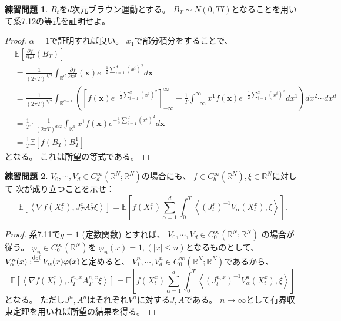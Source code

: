 \documentclass[uplatex]{jsarticle}
\theoremstyle{definition}
\newtheorem{prob}[prob]{練習問題}
\def\R{\mathbb{R}}
\def\E{\mathbb{E}}
\def\dfn{:\overset{\mbox{{\scriptsize def}}}{=}}
\begin{document}
\begin{prob}\label{prob: 7.6}
  \(B_t\)を\(d\)次元ブラウン運動とする。
  \(B_T \sim N(0,TI)\)となることを用いて系7.12の等式を証明せよ。
\end{prob}

\begin{proof}
  \(\alpha = 1\)で証明すれば良い。
  \(x_1\)で部分積分をすることで、
  \begin{align*}
    &\E \left[ \frac{\partial f}{\partial x^1}(B_T)\right] \\
    &= \frac{1}{(2\pi T)^{d/2}} \int_{\R^d}
    \frac{\partial f}{\partial x^1}(\mathbf{x})
    e^{-\frac{1}{2}\sum_{i=1}^d (x^i)^2} d\mathbf{x} \\
    &= \frac{1}{(2\pi T)^{d/2}} \int_{\R^{d-1}} \left( \left[
    f(\mathbf{x})e^{-\frac{1}{2}\sum_{i=1}^d (x^i)^2} \right]_{-\infty}^\infty
    + \frac{1}{T} \int_{-\infty}^\infty x^1 f(\mathbf{x})
    e^{-\frac{1}{2}\sum_{i=1}^d (x^i)^2}  dx^1
    \right) dx^2 \cdots dx^d \\
    &= \frac{1}{T} \cdot \frac{1}{(2\pi T)^{d/2}} \int_{\R^d}
    x^1 f(\mathbf{x}) e^{-\frac{1}{2}\sum_{i=1}^d (x^i)^2} d\mathbf{x} \\
    &= \frac{1}{T}\E \left[ f(B_T)B_T^1 \right]
  \end{align*}
  となる。
  これは所望の等式である。
\end{proof}






\begin{prob}\label{prob: 7.7}
  \(V_0,\cdots, V_d\in C_d^\infty(\R^N;\R^N)\)の場合にも、
  \(f\in C_b^\infty(\R^N),\xi\in \R^N\)に対して
  次が成り立つことを示せ：
  \[
  \E\left[ \left< \nabla f(X_t^x) , J_T^xA_T^x\xi \right>\right]
  = \E \left[ f(X_t^x)\sum_{\alpha = 1}^d \int_0^T \left<
  (J_t^x)^{-1}V_\alpha(X_t^x),\xi \right>\right].
  \]
\end{prob}

\begin{proof}
  系7.11で\(g = 1\) (定数関数) とすれば、
  \(V_0,\cdots, V_d\in C_0^\infty(\R^N;\R^N)\)
  の場合が従う。
  \(\varphi_n\in C_0^\infty(\R^N)\)を
  \(\varphi_n(x) = 1 , (|x| \leq n)\)となるものとして、
  \(V^n_\alpha(x) \dfn V_\alpha (x)\varphi(x)\)と定めると、
  \(V^n_1,\cdots ,V_d^n\in C_0^\infty(\R^N;\R^N)\)であるから、
  \[
  \E\left[ \left< \nabla f(X_t^x) , J_T^{n,x}A_T^{n,x}\xi \right>\right]
  = \E \left[ f(X_t^x)\sum_{\alpha = 1}^d \int_0^T \left<
  (J_t^{n,x})^{-1}V_\alpha^n(X_t^x),\xi \right>\right]
  \]
  となる。
  ただし\(J^n,A^n\)はそれぞれ\(V^n\)に対する\(J,A\)である。
  \(n\to \infty\)として有界収束定理を用いれば所望の結果を得る。
\end{proof}
\end{document}
